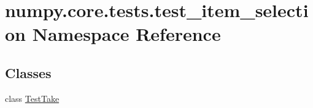\hypertarget{namespacenumpy_1_1core_1_1tests_1_1test__item__selection}{}\section{numpy.\+core.\+tests.\+test\+\_\+item\+\_\+selection Namespace Reference}
\label{namespacenumpy_1_1core_1_1tests_1_1test__item__selection}
\subsection*{Classes}
\begin{DoxyCompactItemize}
\item 
class \hyperlink{classnumpy_1_1core_1_1tests_1_1test__item__selection_1_1TestTake}{Test\+Take}
\end{DoxyCompactItemize}
